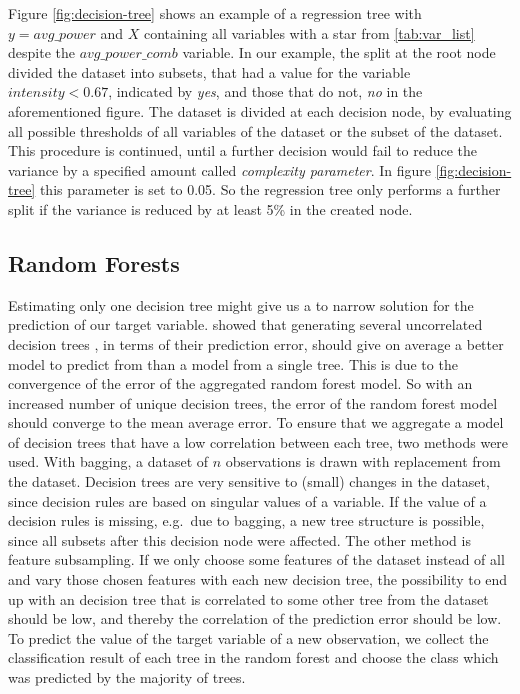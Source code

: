 \documentclass[12pt,a4paper]{article}
\begin{document}
Figure \ref{fig:decision-tree} shows an example of a regression tree with \(y = avg\_power\) and \(X\) containing all variables with a star from \ref{tab:var_list} despite the \(avg\_power\_comb\) variable. In our example, the split at the root node divided the dataset into subsets, that had a value for the variable \(intensity < 0.67\), indicated by \textit{yes}, and those that do not, \textit{no} in the aforementioned figure. The dataset is divided at each decision node, by evaluating all possible thresholds of all variables of the dataset or the subset of the dataset. This procedure is continued, until a further decision would fail to reduce the variance by a specified amount called \textit{complexity parameter}. In figure \ref{fig:decision-tree} this parameter is set to 0.05. So the regression tree only performs a further split if the variance is reduced by at least 5\% in the created node.

\hypertarget{random-forests}{%
\subsection{Random Forests}\label{random-forests}}

Estimating only one decision tree might give us a to narrow solution for the prediction of our target variable. \textcite{Breiman2001} showed that generating several uncorrelated decision trees , in terms of their prediction error, should give on average a better model to predict from than a model from a single tree. This is due to the convergence of the error of the aggregated random forest model. So with an increased number of unique decision trees, the error of the random forest model should converge to the mean average error. To ensure that we aggregate a model of decision trees that have a low correlation between each tree, two methods were used. With bagging, a dataset of \(n\) observations is drawn with replacement from the dataset. Decision trees are very sensitive to (small) changes in the dataset, since decision rules are based on singular values of a variable. If the value of a decision rules is missing, e.g.~due to bagging, a new tree structure is possible, since all subsets after this decision node were affected. The other method is feature subsampling. If we only choose some features of the dataset instead of all and vary those chosen features with each new decision tree, the possibility to end up with an decision tree that is correlated to some other tree from the dataset should be low, and thereby the correlation of the prediction error should be low. To predict the value of the target variable of a new observation, we collect the classification result of each tree in the random forest and choose the class which was predicted by the majority of trees.
\end{document}
